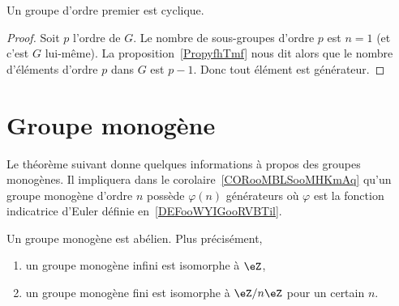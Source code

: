 \begin{corollary}
    Un groupe d'ordre premier est cyclique.
\end{corollary}

\begin{proof}
    Soit \( p\) l'ordre de \( G\). Le nombre de sous-groupes d'ordre \( p\) est \( n=1\) (et c'est \( G\) lui-même). La proposition~\ref{PropyfhTmf} nous dit alors que le nombre d'éléments d'ordre \( p\) dans \( G\) est \( p-1\). Donc tout élément est générateur.
\end{proof}


\section{Groupe monogène}
\label{SECooXIHPooWVSjhT}

Le théorème suivant donne quelques informations à propos des groupes monogènes. Il impliquera dans le corolaire~\ref{CORooMBLSooMHKmAq} qu'un groupe monogène d'ordre \( n\) possède \( \varphi(n)\) générateurs où \( \varphi\) est la fonction indicatrice d'Euler définie en~\ref{DEFooWYIGooRVBTil}.

\begin{theorem}     \label{THOooDOMZooOEYHAe}
    Un groupe monogène est abélien. Plus précisément,
    \begin{enumerate}
        \item
            un groupe monogène infini est isomorphe à \( \eZ\),
        \item
            un groupe monogène fini est isomorphe à \( \eZ/n\eZ\) pour un certain \( n\).
    \end{enumerate}
\end{theorem}

